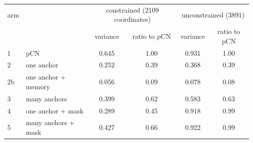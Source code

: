 \begin{tabular}{llcccc}\toprule
 arm & & \multicolumn{2}{c}{constrained (2109 coordinates)} & \multicolumn{2}{c}{unconstrained (3891)} \\
 & & variance & ratio to pCN & variance & ratio to pCN \\ \midrule
1 & pCN & 0.645 & 1.00 & 0.931 & 1.00 \\
2 & one anchor & 0.252 & 0.39 & 0.368 & 0.39 \\
2b & one anchor + memory & 0.056 & 0.09 & 0.078 & 0.08 \\
3 & many anchors & 0.399 & 0.62 & 0.583 & 0.63 \\
4 & one anchor + mask & 0.289 & 0.45 & 0.918 & 0.99 \\
5 & many anchors + mask & 0.427 & 0.66 & 0.922 & 0.99 \\
\bottomrule\end{tabular}
